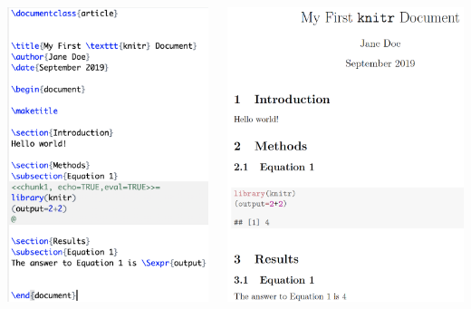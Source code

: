 \documentclass{beamer}\usepackage[]{graphicx}\usepackage[]{color}
\begin{document}
\begin{frame}
   \begin{columns}
     \begin{column}{0.5\textwidth}
       \includegraphics[width=.8\linewidth,keepaspectratio]{knitr1a}
      \end{column}
      \begin{column}{0.5\textwidth}
        \includegraphics[width=.8\linewidth,keepaspectratio]{knitr1b}
      \end{column}
    \end{columns}
\end{frame}
\end{document}
